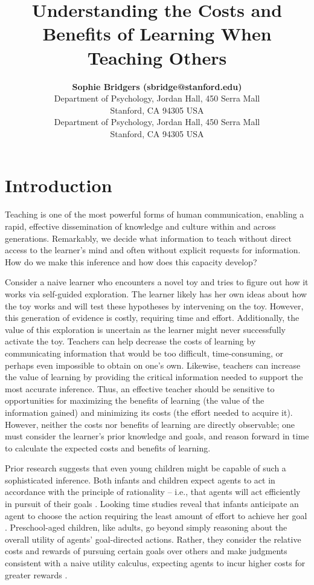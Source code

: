 \documentclass[10pt,letterpaper]{article}
\title{Understanding the Costs and Benefits of Learning When Teaching Others}
\author{{\large \bf Sophie Bridgers (sbridge@stanford.edu)} \\
  Department of Psychology, Jordan Hall, 450 Serra Mall \\
 Stanford, CA 94305 USA
  \AND {\large \bf Emily Tang (emjtang@stanford.edu)} \\
   Department of Psychology, Jordan Hall, 450 Serra Mall \\
 Stanford, CA 94305 USA}
\begin{document}
\maketitle

\section{Introduction}

Teaching is one of the most powerful forms of human communication, enabling a rapid, effective dissemination of knowledge and culture within and across generations. Remarkably, we decide what information to teach without direct access to the learner's mind and often without explicit requests for information. How do we make this inference and how does this capacity develop? 

Consider a naive learner who encounters a novel toy and tries to figure out how it works via self-guided exploration. The learner likely has her own ideas about how the toy works and will test these hypotheses by intervening on the toy. However, this generation of evidence is costly, requiring time and effort. Additionally, the value of this exploration is uncertain as the learner might never successfully activate the toy. Teachers can help decrease the costs of learning by communicating information that would be too difficult, time-consuming, or perhaps even impossible to obtain on one's own. Likewise, teachers can increase the value of learning by providing the critical information needed to support the most accurate inference. Thus, an effective teacher should be sensitive to opportunities for maximizing the benefits of learning (the value of the information gained) and minimizing its costs (the effort needed to acquire it). However, neither the costs nor benefits of learning are directly observable; one must consider the learner's prior knowledge and goals, and reason forward in time to calculate the expected costs and benefits of learning.

Prior research suggests that even young children might be capable of such a sophisticated inference. Both infants and children expect agents to act in accordance with the principle of rationality -- i.e., that agents will act efficiently in pursuit of their goals \cite{Baker2009}. 
Looking time studies reveal that infants anticipate an agent to choose the action requiring the least amount of effort to achieve her goal \cite{Scott2013}.
Preschool-aged children, like adults, go beyond simply reasoning about the overall utility of agents' goal-directed actions. 
Rather, they consider the relative costs and rewards of pursuing certain goals over others and make judgments consistent with a naive utility calculus, expecting agents to incur higher costs for greater rewards \cite{JaraEttinger2015}.
\end{document}
